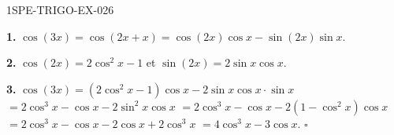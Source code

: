 \begin{corrige}{1SPE-TRIGO-EX-026}

\textbf{1.} $\cos(3x) = \cos(2x + x) = \cos(2x)\cos x - \sin(2x)\sin x$.

\textbf{2.} $\cos(2x) = 2\cos^2 x - 1$ et $\sin(2x) = 2\sin x\cos x$.

\textbf{3.} $\cos(3x) = (2\cos^2 x - 1)\cos x - 2\sin x\cos x \cdot \sin x$
$= 2\cos^3 x - \cos x - 2\sin^2 x\cos x$
$= 2\cos^3 x - \cos x - 2(1-\cos^2 x)\cos x$
$= 2\cos^3 x - \cos x - 2\cos x + 2\cos^3 x$
$= 4\cos^3 x - 3\cos x$. \hfill $\square$

\end{corrige}
